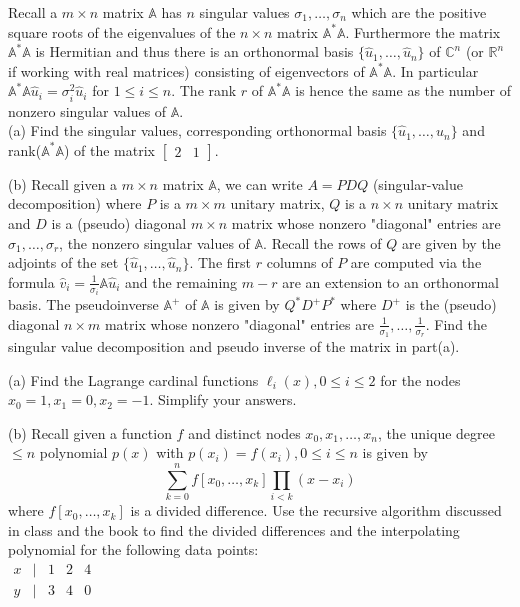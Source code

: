 \documentclass[12pt]{article}
\begin{document}
\vspace{3in}

Recall a $m \times n$ matrix $\mathbb{A}$ has $n$ singular values $\sigma_1, \dots, \sigma_n$ which are the 
positive square roots of the eigenvalues of the $n \times n$ matrix $\mathbb{A}^* \mathbb{A}$. Furthermore the matrix $\mathbb{A}^* \mathbb{A}$ is Hermitian and thus there 
is an orthonormal basis $\{ \hat{u}_1, \dots, \hat{u}_n \}$ of $\mathbb{C}^n$ (or $\mathbb{R}^n$ if working with real matrices) consisting of eigenvectors of $\mathbb{A}^*\mathbb{A}$. In particular $\mathbb{A}^*\mathbb{A} \hat{u}_i = \sigma_i^2 \hat{u}_i$ for $1 \leq i \leq n$. The rank $r$ of $\mathbb{A}^* \mathbb{A}$ 
is hence the same as the number of nonzero singular values of $\mathbb{A}$. \\
(a) Find the singular values, corresponding orthonormal basis $\{ \hat{u}_1, \dots, \hat{u}_n \}$ and rank($\mathbb{A}^*\mathbb{A}$) of the matrix 
$\begin{bmatrix} 2 & 1 \end{bmatrix}$.

\vspace{3in}
\noindent
(b) Recall given a $m \times n$ matrix $\mathbb{A}$, we can write $A=PDQ$ (singular-value decomposition) where $P$ is a $m \times m$ unitary matrix, $Q$ is a $n \times n$ unitary matrix and $D$ is a (pseudo) diagonal $m \times n$ matrix whose nonzero "diagonal" entries are $\sigma_1, \dots, \sigma_r$, the nonzero singular values of $\mathbb{A}$. Recall the rows of $Q$ are given by the adjoints of the set $\{ \hat{u}_1, \dots, \hat{u}_n \}$. The first $r$ columns of $P$ are computed 
via the formula $\hat{v}_i = \frac{1}{\sigma_i} \mathbb{A} \hat{u}_i$ and the remaining $m-r$ are an extension to an orthonormal basis. The pseudoinverse 
$\mathbb{A}^+$ of $\mathbb{A}$ is given by $Q^*D^+P^*$ where $D^+$ is the (pseudo) diagonal $n \times m$ matrix whose nonzero 
"diagonal" entries are $\frac{1}{\sigma_1}, \dots, \frac{1}{\sigma_r}$. Find the singular value decomposition and pseudo inverse of the matrix 
in part(a). \\

\newpage

(a) Find the Lagrange cardinal functions $\ell_i(x), 0 \leq i \leq 2$ for the nodes $x_0=1, x_1=0, x_2=-1$. 
Simplify your answers. 

\vspace{2 in}

\noindent
(b) Recall given a function $f$ and distinct nodes $x_0, x_1, \dots, x_n$, the unique degree $\leq n$ polynomial $p(x)$ with $p(x_i)=f(x_i), 0 \leq i \leq n$ 
is given by 
$$
\sum_{k=0}^n f[x_0,\dots,x_k] \prod_{i < k} (x-x_i)
$$
where $f[x_0,\dots,x_k]$ is a divided difference. Use the recursive algorithm discussed in class and the book to find the divided differences and 
the interpolating polynomial for the following data points: \\
$\begin{matrix} x & | & 1 & 2 & 4 
\\  y & | & 3 & 4 & 0
\end{matrix}$
\end{document}
